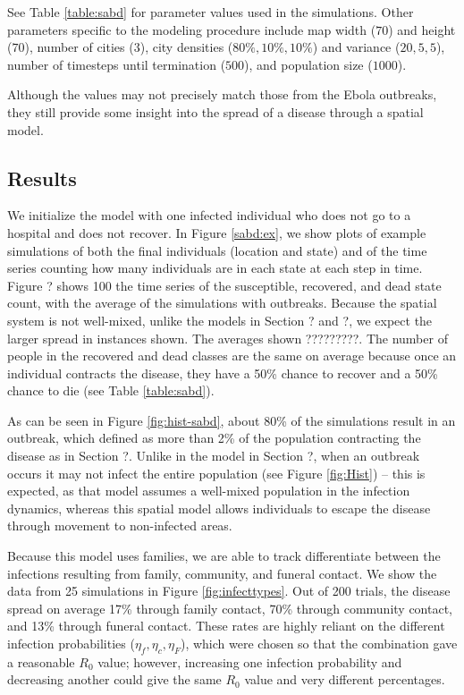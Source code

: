See Table \ref{table:sabd} for parameter values used in the simulations. Other parameters specific to the modeling procedure include map width ($70$) and height ($70$), number of cities ($3$), city densities ($80\%, 10\%, 10\%$) and variance ($20,5,5$), number of timesteps until termination ($500$), and population size ($1000$).

Although the values may not precisely match those from the Ebola outbreaks, they still provide some insight into the spread of a disease through a spatial model.


\subsection{Results}

We initialize the model with one infected individual who does not go to a hospital and does not recover. In Figure \ref{sabd:ex}, we show plots of example simulations of both the final individuals (location and state) and of the time series counting how many individuals are in each state at each step in time. Figure ? shows 100 the time series of the susceptible, recovered, and dead state count, with the average of the simulations with outbreaks. Because the spatial system is not well-mixed, unlike the models in Section ? and ?, we expect the larger spread in instances shown. The averages shown ?????????. The number of people in the recovered and dead classes are the same on average because once an individual contracts the disease, they have a 50\% chance to recover and a 50\% chance to die (see Table \ref{table:sabd}).

As can be seen in Figure \ref{fig:hist-sabd}, about 80\% of the simulations result in an outbreak, which defined as more than 2\% of the population contracting the disease as in Section ?. Unlike in the model in Section ?, when an outbreak occurs it may not infect the entire population (see Figure \ref{fig:Hist}) -- this is expected, as that model assumes a well-mixed population in the infection dynamics, whereas this spatial model allows individuals to escape the disease through movement to non-infected areas.

Because this model uses families, we are able to track differentiate between the infections resulting from family, community, and funeral contact. We show the data from 25 simulations in Figure \ref{fig:infecttypes}. Out of 200 trials, the disease spread on average 17\% through family contact, 70\% through community contact, and 13\% through funeral contact. These rates are highly reliant on the different infection probabilities ($\eta_f,\eta_c,\eta_F$), which were chosen so that the combination gave a reasonable $R_0$ value; however, increasing one infection probability and decreasing another could give the same $R_0$ value and very different percentages.


